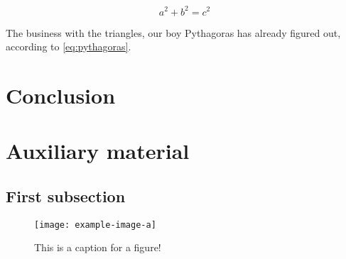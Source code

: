 \documentclass[12pt,a4paper]{scrarticle}
\begin{document}
\begin{equation}
    a^2 + b^2 = c^2
    \label{eq:pythagoras}
\end{equation}

The business with the triangles, our boy Pythagoras has already figured out, according to \autoref{eq:pythagoras}.

\section{Conclusion}

\lipsum[1] 

\appendix

\section{Auxiliary material}
\subsection{First subsection}

\lipsum[1] 

\begin{figure}[ht]
    \centering
    \texttt{[image: example-image-a]}
    \caption{This is a caption for a figure!}
    \label{fig:appendix_example_a}
\end{figure}

\printbibliography{}
\end{document}
